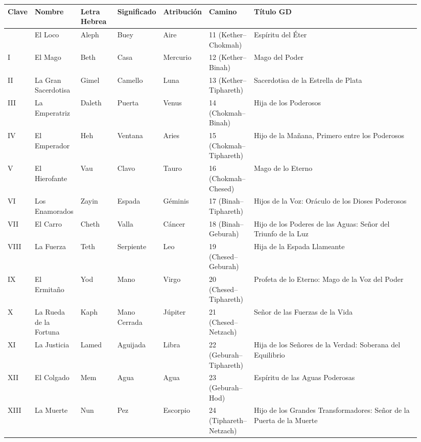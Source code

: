 \begin{longtable}[]{@{}>{\RaggedRight\small}p{0.05\linewidth}>{\RaggedRight\small}p{0.11\linewidth}>{\RaggedRight\small}p{0.09\linewidth}>{\RaggedRight\small}p{0.10\linewidth}>{\RaggedRight\small}p{0.09\linewidth}>{\RaggedRight\small}p{0.07\linewidth}>{\RaggedRight\small}p{0.43\linewidth}@{}}
\toprule\noalign{}
Clave & Nombre & Letra Hebrea & Significado & Atribución & Camino & Título GD \\
\midrule\noalign{}
\endhead
\bottomrule\noalign{}
\endlastfoot
0 & El Loco & Aleph & Buey & Aire & 11 (Kether--Chokmah) & Espíritu del Éter \\
I & El Mago & Beth & Casa & Mercurio & 12 (Kether--Binah) & Mago del Poder \\
II & La Gran Sacerdotisa & Gimel & Camello & Luna & 13 (Kether--Tiphareth) & Sacerdotisa de la Estrella de Plata \\
III & La Emperatriz & Daleth & Puerta & Venus & 14 (Chokmah--Binah) & Hija de los Poderosos \\
IV & El Emperador & Heh & Ventana & Aries & 15 (Chokmah--Tiphareth) & Hijo de la Mañana, Primero entre los Poderosos \\
V & El Hierofante & Vau & Clavo & Tauro & 16 (Chokmah--Chesed) & Mago de lo Eterno \\
VI & Los Enamorados & Zayin & Espada & Géminis & 17 (Binah--Tiphareth) & Hijos de la Voz: Oráculo de los Dioses Poderosos \\
VII & El Carro & Cheth & Valla & Cáncer & 18 (Binah--Geburah) & Hijo de los Poderes de las Aguas: Señor del Triunfo de la Luz \\
VIII & La Fuerza & Teth & Serpiente & Leo & 19 (Chesed--Geburah) & Hija de la Espada Llameante \\
IX & El Ermitaño & Yod & Mano & Virgo & 20 (Chesed--Tiphareth) & Profeta de lo Eterno: Mago de la Voz del Poder \\
X & La Rueda de la Fortuna & Kaph & Mano Cerrada & Júpiter & 21 (Chesed--Netzach) & Señor de las Fuerzas de la Vida \\
XI & La Justicia & Lamed & Aguijada & Libra & 22 (Geburah--Tiphareth) & Hija de los Señores de la Verdad: Soberana del Equilibrio \\
XII & El Colgado & Mem & Agua & Agua & 23 (Geburah--Hod) & Espíritu de las Aguas Poderosas \\
XIII & La Muerte & Nun & Pez & Escorpio & 24 (Tiphareth--Netzach) & Hijo de los Grandes Transformadores: Señor de la Puerta de la Muerte \\

\end{longtable}
